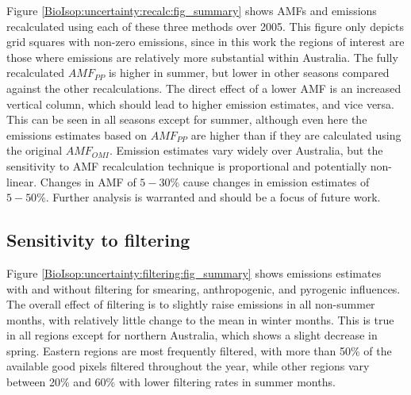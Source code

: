       Figure \ref{BioIsop:uncertainty:recalc:fig_summary} shows AMFs and emissions recalculated using each of these three methods over 2005.
      This figure only depicts grid squares with non-zero emissions, since in this work the regions of interest are those where emissions are relatively more substantial within Australia.
      The fully recalculated $AMF_{PP}$ is higher in summer, but lower in other seasons compared against the other recalculations.
      The direct effect of a lower AMF is an increased vertical column, which should lead to higher emission estimates, and vice versa.
      This can be seen in all seasons except for summer, although even here the emissions estimates based on $AMF_{PP}$ are higher than if they are calculated using the original $AMF_{OMI}$.
      Emission estimates vary widely over Australia, but the sensitivity to AMF recalculation technique is proportional and potentially non-linear.
      Changes in AMF of $5-30\%$ cause changes in emission estimates of $5-50\%$.
      Further analysis is warranted and should be a focus of future work.
      
      
      
  
    \subsection{Sensitivity to filtering}
    \label{BioIsop:uncertainty:filtering}
    
      Figure \ref{BioIsop:uncertainty:filtering:fig_summary} shows emissions estimates with and without filtering for smearing, anthropogenic, and pyrogenic influences.
      The overall effect of filtering is to slightly raise emissions in all non-summer months, with relatively little change to the mean in winter months.
      This is true in all regions except for northern Australia, which shows a slight decrease in spring.
      Eastern regions are most frequently filtered, with more than 50\% of the available good pixels filtered throughout the year, while other regions vary between 20\% and 60\% with lower filtering rates in summer months.
      
